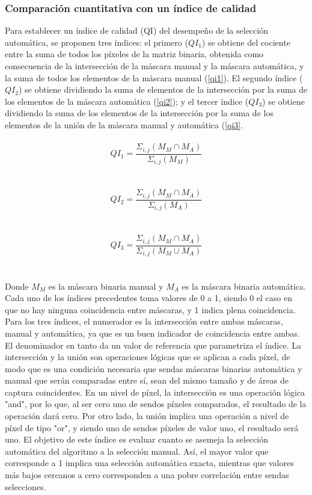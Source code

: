 \subsubsection{Comparación cuantitativa con un índice de calidad}
Para establecer un índice de calidad (QI) del desempeño de la selección automática, se proponen tres índices: el primero ($QI_1$) se obtiene del cociente entre la suma de todos los píxeles de la matriz binaria, obtenida como consecuencia de la intersección de la máscara manual y la máscara automática, y la suma de todos los elementos de la máscara manual (\ref{qi1}). El segundo índice ($QI_2$) se obtiene dividiendo la suma de elementos de la intersección por la suma de los elementos de la máscara automática (\ref{qi2}); y el tercer índice ($QI_3$) se obtiene dividiendo la suma de los elementos de la intersección por la suma de los elementos de la unión de la máscara manual y automática (\ref{qi3}.
\\
\\
 \begin{equation}
    QI_1=\frac{\Sigma _{i,j}(M_M\cap M_A )}{\Sigma _{i,j}(M_M ) }
    \label{qi1}
\end{equation}
\\
\\
 \begin{equation}
    QI_2=\frac{\Sigma _{i,j}(M_M\cap M_A )}{\Sigma _{i,j}(M_A ) }
    \label{qi2}
\end{equation}
\\
\\
\begin{equation}
    QI_3=\frac{\Sigma _{i,j}(M_M\cap M_A )}{\Sigma _{i,j}(M_M \cup M_A ) }
    \label{qi3}
\end{equation}
\\
\\
Donde $M_M$ es la máscara binaria manual y $M_A$ es la máscara binaria automática. Cada uno de los índices precedentes toma valores de 0 a 1, siendo 0 el caso en que no hay ninguna coincidencia entre máscaras, y 1 indica plena coincidencia. Para los tres índices, el numerador es la intersección entre ambas máscaras, manual y automática, ya que es un buen indicador de coincidencia entre ambas. El denominador en tanto da un valor de referencia que parametriza el índice. La intersección y la unión son operaciones lógicas que se aplican a cada píxel, de modo que es una condición necesaria que sendas máscaras binarias automática y manual que serán comparadas entre sí, sean del mismo tamaño y de áreas de captura coincidentes. En un nivel de píxel, la intersección es una operación lógica "and", por lo que, al ser cero uno de sendos píxeles comparados, el resultado de la operación dará cero. Por otro lado, la unión implica una operación a nivel de píxel de tipo "or", y siendo uno de sendos píxeles de valor uno, el resultado será uno. El objetivo de este índice es evaluar cuanto se asemeja la selección automática del algoritmo a la selección manual. Así, el mayor valor que corresponde a 1 implica una selección automática exacta, mientras que valores más bajos cercanos a cero corresponden a una pobre correlación entre sendas selecciones.


